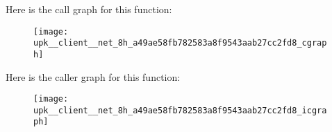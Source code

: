 Here is the call graph for this function:\nopagebreak
\begin{figure}[H]
\begin{center}
\leavevmode
\texttt{[image: upk\_\_client\_\_net\_8h\_a49ae58fb782583a8f9543aab27cc2fd8\_cgraph]}
\end{center}
\end{figure}




Here is the caller graph for this function:
\nopagebreak
\begin{figure}[H]
\begin{center}
\leavevmode
\texttt{[image: upk\_\_client\_\_net\_8h\_a49ae58fb782583a8f9543aab27cc2fd8\_icgraph]}
\end{center}
\end{figure}


